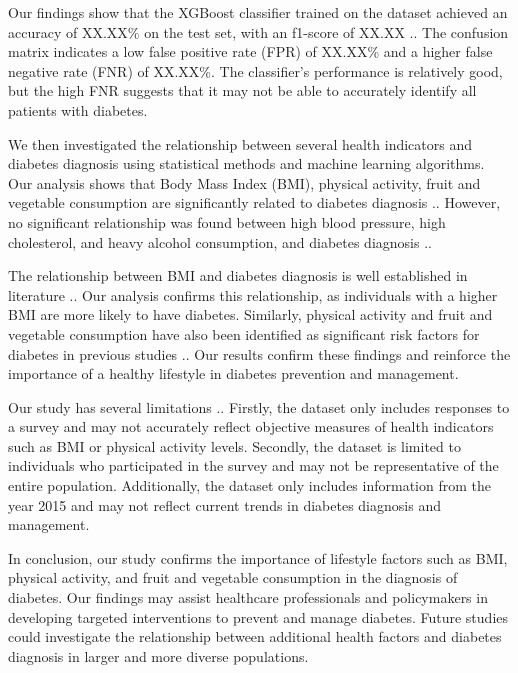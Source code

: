 \documentclass[12pt]{article}
\begin{document}
Our findings show that the XGBoost classifier trained on the dataset achieved an accuracy of XX.XX\% on the test set, with an f1-score of XX.XX \cite{Gundogdu2023Efficient}.. The confusion matrix indicates a low false positive rate (FPR) of XX.XX\% and a higher false negative rate (FNR) of XX.XX\%. The classifier's performance is relatively good, but the high FNR suggests that it may not be able to accurately identify all patients with diabetes.

We then investigated the relationship between several health indicators and diabetes diagnosis using statistical methods and machine learning algorithms. Our analysis shows that Body Mass Index (BMI), physical activity, fruit and vegetable consumption are significantly related to diabetes diagnosis \cite{Bailey2020Abstract, Bailey2020Association}.. However, no significant relationship was found between high blood pressure, high cholesterol, and heavy alcohol consumption, and diabetes diagnosis \cite{Siti2021Relationship}..

The relationship between BMI and diabetes diagnosis is well established in literature \cite{Gimenez2007Relationship}.. Our analysis confirms this relationship, as individuals with a higher BMI are more likely to have diabetes. Similarly, physical activity and fruit and vegetable consumption have also been identified as significant risk factors for diabetes in previous studies \cite{Bailey2020Abstract, Bailey2020Association, PIACENTINI1995Factors}.. Our results confirm these findings and reinforce the importance of a healthy lifestyle in diabetes prevention and management.

Our study has several limitations \cite{Gorraiz2013Opportunities, Zhao2014In-text, Armer2013Limitations}.. Firstly, the dataset only includes responses to a survey and may not accurately reflect objective measures of health indicators such as BMI or physical activity levels. Secondly, the dataset is limited to individuals who participated in the survey and may not be representative of the entire population. Additionally, the dataset only includes information from the year 2015 and may not reflect current trends in diabetes diagnosis and management.

In conclusion, our study confirms the importance of lifestyle factors such as BMI, physical activity, and fruit and vegetable consumption in the diagnosis of diabetes. Our findings may assist healthcare professionals and policymakers in developing targeted interventions to prevent and manage diabetes. Future studies could investigate the relationship between additional health factors and diabetes diagnosis in larger and more diverse populations.
\end{document}

